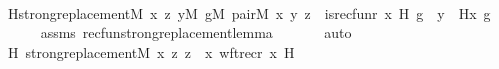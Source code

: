 \begin{isabellebody}
%
\isadelimproof
%
\endisadelimproof
%
\isatagproof
{}\isamarkupfalse%
\ {\isacharminus}{\kern0pt}\ \isanewline
\ \ \isamarkupfalse%
\ H{\isacharcolon}{\kern0pt}{\isachardoublequoteopen}strong{\isacharunderscore}{\kern0pt}replacement{\isacharparenleft}{\kern0pt}{\isacharhash}{\kern0pt}{\isacharhash}{\kern0pt}M{\isacharcomma}{\kern0pt}\ {\isasymlambda}x\ z{\isachardot}{\kern0pt}\ {\isasymexists}y{\isacharbrackleft}{\kern0pt}{\isacharhash}{\kern0pt}{\isacharhash}{\kern0pt}M{\isacharbrackright}{\kern0pt}{\isachardot}{\kern0pt}\ {\isasymexists}g{\isacharbrackleft}{\kern0pt}{\isacharhash}{\kern0pt}{\isacharhash}{\kern0pt}M{\isacharbrackright}{\kern0pt}{\isachardot}{\kern0pt}\ pair{\isacharparenleft}{\kern0pt}{\isacharhash}{\kern0pt}{\isacharhash}{\kern0pt}M{\isacharcomma}{\kern0pt}\ x{\isacharcomma}{\kern0pt}\ y{\isacharcomma}{\kern0pt}\ z{\isacharparenright}{\kern0pt}\ {\isasymand}\ is{\isacharunderscore}{\kern0pt}recfun{\isacharparenleft}{\kern0pt}r{\isacharcomma}{\kern0pt}\ x{\isacharcomma}{\kern0pt}\ H{\isacharcomma}{\kern0pt}\ g{\isacharparenright}{\kern0pt}\ {\isasymand}\ y\ {\isacharequal}{\kern0pt}\ H{\isacharparenleft}{\kern0pt}x{\isacharcomma}{\kern0pt}\ g{\isacharparenright}{\kern0pt}{\isacharparenright}{\kern0pt}{\isachardoublequoteclose}\isanewline
\ \ \ \ \isamarkupfalse%
\ assms\ recfun{\isacharunderscore}{\kern0pt}strong{\isacharunderscore}{\kern0pt}replacement{\isacharunderscore}{\kern0pt}lemma\ \isanewline
\ \ \ \ \isamarkupfalse%
\ auto\isanewline
\isanewline
\ \ \isamarkupfalse%
\ H{}{\isacharcolon}{\kern0pt}\ {\isachardoublequoteopen}strong{\isacharunderscore}{\kern0pt}replacement{\isacharparenleft}{\kern0pt}{\isacharhash}{\kern0pt}{\isacharhash}{\kern0pt}M{\isacharcomma}{\kern0pt}\ {\isasymlambda}x\ z{\isachardot}{\kern0pt}\ z\ {\isacharequal}{\kern0pt}\ {\isacharless}{\kern0pt}x{\isacharcomma}{\kern0pt}\ wftrec{\isacharparenleft}{\kern0pt}r{\isacharcomma}{\kern0pt}\ x{\isacharcomma}{\kern0pt}\ H{\isacharparenright}{\kern0pt}{\isachargreater}{\kern0pt}{\isacharparenright}{\kern0pt}{\isachardoublequoteclose}\ \isanewline
\ \ \ \ \isamarkupfalse%

\end{isabellebody}
